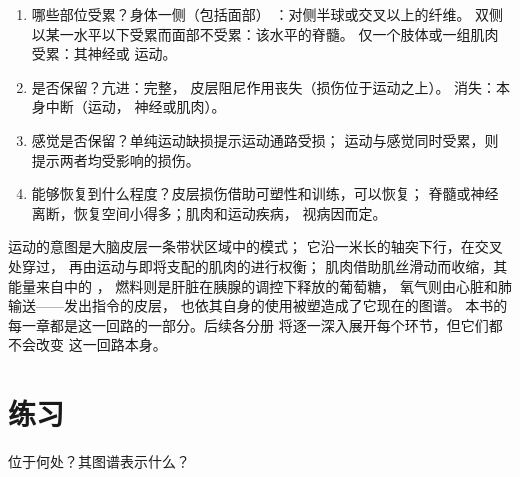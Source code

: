 \begin{method}[定位运动障碍]\label{met:g12:brain-and-movement:locate}
\begin{enumerate}
  \item 哪些部位受累？身体一侧（包括面部）
        ：对侧半球或交叉以上的纤维。
        双侧以某一水平以下受累而面部不受累：该水平的脊髓。
        仅一个肢体或一组肌肉受累：其神经或
        运动。
  \item {}是否保留？亢进：完整，
        皮层阻尼作用丧失（损伤位于运动之上）。
        消失：本身中断（运动，
        神经或肌肉）。
  \item 感觉是否保留？单纯运动缺损提示运动通路受损；
        运动与感觉同时受累，则提示两者均受影响的损伤。
  \item 能够恢复到什么程度？皮层损伤借助可塑性和训练，可以恢复；
        脊髓或神经离断，恢复空间小得多；肌肉和运动疾病，
        视病因而定。
\end{enumerate}
\end{method}

\begin{remark}[一年中的最后一个回路]\label{rem:g12:brain-and-movement:loop}
运动的意图是大脑皮层一条带状区域中的模式；
它沿一米长的轴突下行，在交叉处穿过，
再由运动与即将支配的肌肉的进行权衡；
肌肉借助肌丝滑动而收缩，其能量来自中的 ，
燃料则是肝脏在胰腺的调控下释放的葡萄糖，
氧气则由心脏和肺输送——发出指令的皮层，
也依其自身的使用被塑造成了它现在的图谱。
本书的每一章都是这一回路的一部分。后续各分册
将逐一深入展开每个环节，但它们都不会改变
这一回路本身。
\end{remark}

\section{练习}

\begin{exercise}[$\star$]\label{exo:g12:brain-and-movement:1}
位于何处？其图谱表示什么？
\end{exercise}

